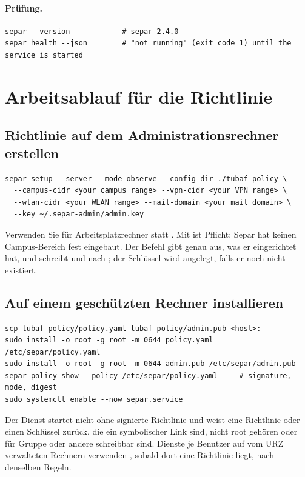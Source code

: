 \documentclass[11pt,a4paper]{article}
\begin{document}
\paragraph{Prüfung.}
\begin{lstlisting}
separ --version            # separ 2.4.0
separ health --json        # "not_running" (exit code 1) until the service is started
\end{lstlisting}

\section{Arbeitsablauf für die Richtlinie}
\label{sec:policy}

\subsection{Richtlinie auf dem Administrationsrechner erstellen}
\begin{lstlisting}
separ setup --server --mode observe --config-dir ./tubaf-policy \
  --campus-cidr <your campus range> --vpn-cidr <your VPN range> \
  --wlan-cidr <your WLAN range> --mail-domain <your mail domain> \
  --key ~/.separ-admin/admin.key
\end{lstlisting}
Verwenden Sie für Arbeitsplatzrechner \cmd{--laptop} statt . Mit  ist
\cmd{--campus-cidr} Pflicht; Separ hat keinen Campus-Bereich fest eingebaut. Der Befehl gibt genau
aus, was er eingerichtet hat, und schreibt  und  nach
\cmd{./tubaf-policy}; der Schlüssel wird angelegt, falls er noch nicht existiert.

\subsection{Auf einem geschützten Rechner installieren}
\begin{lstlisting}
scp tubaf-policy/policy.yaml tubaf-policy/admin.pub <host>:
sudo install -o root -g root -m 0644 policy.yaml /etc/separ/policy.yaml
sudo install -o root -g root -m 0644 admin.pub /etc/separ/admin.pub
separ policy show --policy /etc/separ/policy.yaml     # signature, mode, digest
sudo systemctl enable --now separ.service
\end{lstlisting}
Der Dienst startet nicht ohne signierte Richtlinie und weist eine Richtlinie oder einen Schlüssel
zurück, die ein symbolischer Link sind, nicht root gehören oder für Gruppe oder andere schreibbar
sind. Dienste je Benutzer auf vom URZ verwalteten Rechnern verwenden , sobald dort
eine Richtlinie liegt, nach denselben Regeln.
\end{document}
